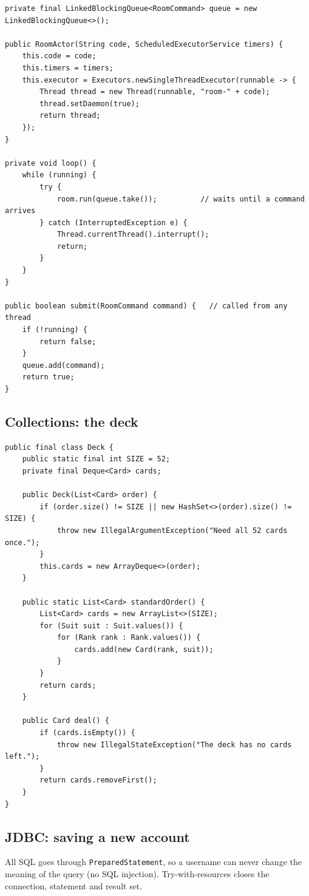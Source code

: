 \documentclass[12pt,a4paper]{article}
\newcommand{\cls}[1]{\texttt{#1}}
\begin{document}
\begin{lstlisting}[caption={Part of \cls{RoomActor} (poker-server, \cls{server.room}).}]
private final LinkedBlockingQueue<RoomCommand> queue = new LinkedBlockingQueue<>();

public RoomActor(String code, ScheduledExecutorService timers) {
    this.code = code;
    this.timers = timers;
    this.executor = Executors.newSingleThreadExecutor(runnable -> {
        Thread thread = new Thread(runnable, "room-" + code);
        thread.setDaemon(true);
        return thread;
    });
}

private void loop() {
    while (running) {
        try {
            room.run(queue.take());          // waits until a command arrives
        } catch (InterruptedException e) {
            Thread.currentThread().interrupt();
            return;
        }
    }
}

public boolean submit(RoomCommand command) {   // called from any thread
    if (!running) {
        return false;
    }
    queue.add(command);
    return true;
}
\end{lstlisting}

\subsection{Collections: the deck}
\begin{lstlisting}[caption={Part of \cls{Deck} (poker-engine, \cls{engine.card}).}]
public final class Deck {
    public static final int SIZE = 52;
    private final Deque<Card> cards;

    public Deck(List<Card> order) {
        if (order.size() != SIZE || new HashSet<>(order).size() != SIZE) {
            throw new IllegalArgumentException("Need all 52 cards once.");
        }
        this.cards = new ArrayDeque<>(order);
    }

    public static List<Card> standardOrder() {
        List<Card> cards = new ArrayList<>(SIZE);
        for (Suit suit : Suit.values()) {
            for (Rank rank : Rank.values()) {
                cards.add(new Card(rank, suit));
            }
        }
        return cards;
    }

    public Card deal() {
        if (cards.isEmpty()) {
            throw new IllegalStateException("The deck has no cards left.");
        }
        return cards.removeFirst();
    }
}
\end{lstlisting}

\subsection{JDBC: saving a new account}
All SQL goes through \cls{PreparedStatement}, so a username can never change the meaning of the
query (no SQL injection). Try-with-resources closes the connection, statement and result set.
\end{document}
